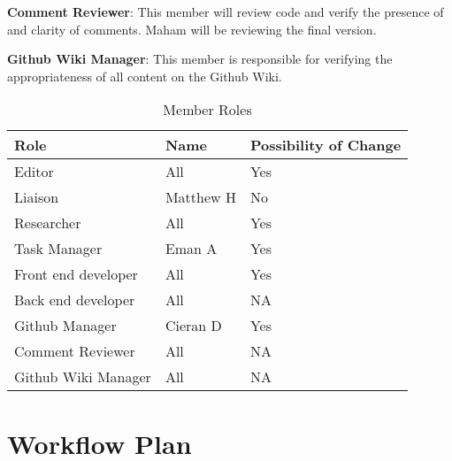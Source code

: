 \documentclass{article}
\begin{document}
\textbf{Comment Reviewer}: This member will review code and verify the presence of and clarity of comments. Maham will be reviewing the final version.

\textbf{Github Wiki Manager}: This member is responsible for verifying the appropriateness of all content on the Github Wiki.

\begin{table}[hp]
\caption{Member Roles} \label{Proposed Assignments}
\begin{tabularx}{\textwidth}{llX}
\toprule
\textbf{Role} & \textbf{Name} & \textbf{Possibility of Change}\\
\midrule
Editor & All & Yes\\
Liaison & Matthew H  & No\\
Researcher & All & Yes \\
Task Manager & Eman A & Yes \\
Front end developer & All & Yes \\
Back end developer & All & NA \\
Github Manager & Cieran D & Yes \\
Comment Reviewer & All & NA \\
Github Wiki Manager & All & NA \\
\bottomrule
\end{tabularx}
\end{table}



\section{Workflow Plan}
\end{document}
